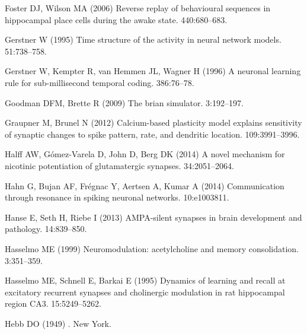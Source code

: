 \begin{thebibliography}{}
Foster DJ, Wilson MA (2006{\rm{}})
\newblock Reverse replay of behavioural sequences in hippocampal place cells
  during the awake state.
 440:680--683.

Gerstner W (1995{\rm{}})
\newblock Time structure of the activity in neural network models.
 51:738--758.

Gerstner W, Kempter R, van Hemmen JL, Wagner H (1996{\rm{}})
\newblock A neuronal learning rule for sub-millisecond temporal coding.
 386:76--78.

Goodman DFM, Brette R (2009{\rm{}})
\newblock The brian simulator.
 3:192--197.

Graupner M, Brunel N (2012{\rm{}})
\newblock Calcium-based plasticity model explains sensitivity of synaptic changes to spike pattern, rate, and dendritic location.
 109:3991--3996.

Halff AW, G{\'o}mez-Varela D, John D, Berg DK (2014{\rm{}})
\newblock A novel mechanism for nicotinic potentiation of glutamatergic
  synapses.
 34:2051--2064.

Hahn G, Bujan AF, Fr\'egnac Y, Aertsen A, Kumar A (2014{\rm{}})
\newblock Communication through resonance in spiking neuronal networks.
 10:e1003811.

Hanse E, Seth H, Riebe I (2013{\rm{}})
\newblock AMPA-silent synapses in brain development and pathology.
 14:839--850.

Hasselmo ME (1999{\rm{}})
\newblock Neuromodulation: acetylcholine and memory consolidation.
 3:351--359.

Hasselmo ME, Schnell E, Barkai E (1995{\rm{}})
\newblock Dynamics of learning and recall at excitatory recurrent synapses and
  cholinergic modulation in rat hippocampal region CA3.
 15:5249--5262.

Hebb DO (1949{\rm{}})
.
\newblock New York.


\end{thebibliography}
